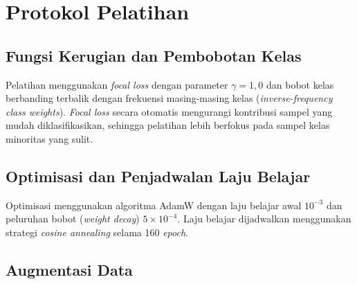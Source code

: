 \section{Protokol Pelatihan}

\subsection{Fungsi Kerugian dan Pembobotan Kelas}

Pelatihan menggunakan \textit{focal loss} \citep{Lin2017} dengan parameter $\gamma = 1{,}0$
dan bobot kelas berbanding terbalik dengan frekuensi masing-masing kelas
(\textit{inverse-frequency class weights}). \textit{Focal loss} secara otomatis mengurangi
kontribusi sampel yang mudah diklasifikasikan, sehingga pelatihan lebih berfokus pada sampel
kelas minoritas yang sulit.

\subsection{Optimisasi dan Penjadwalan Laju Belajar}

Optimisasi menggunakan algoritma AdamW \citep{Loshchilov2019} dengan laju belajar awal
$10^{-3}$ dan peluruhan bobot (\textit{weight decay}) $5 \times 10^{-4}$. Laju belajar
dijadwalkan menggunakan strategi \textit{cosine annealing} selama 160 \textit{epoch}.

\subsection{Augmentasi Data}

